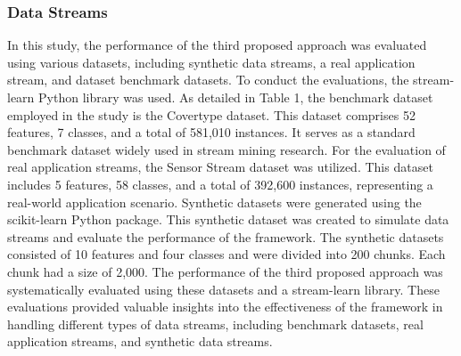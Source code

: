 \subsubsection{Data Streams}
In this study, the performance of the third proposed approach was evaluated using various datasets, including synthetic data streams, a real application stream, and dataset benchmark datasets. To conduct the evaluations, the stream-learn Python library \cite{ksieniewicz2022stream,madkour2023historical} was used. As detailed in Table 1, the benchmark dataset employed in the study is the Covertype dataset. This dataset comprises 52 features, 7 classes, and a total of 581,010 instances. It serves as a standard benchmark dataset widely used in stream mining research. For the evaluation of real application streams, the Sensor Stream dataset was utilized. This dataset includes 5 features, 58 classes, and a total of 392,600 instances, representing a real-world application scenario. Synthetic datasets were generated using the scikit-learn Python package. This synthetic dataset was created to simulate data streams and evaluate the performance of the framework. The synthetic datasets consisted of 10 features and four classes and were divided into 200 chunks. Each chunk had a size of 2,000. The performance of the third proposed approach was systematically evaluated using these datasets and a stream-learn library. These evaluations provided valuable insights into the effectiveness of the framework in handling different types of data streams, including benchmark datasets, real application streams, and synthetic data streams.

\begin{table}[H]
  \centering
  \caption{Summary of Dataset Characteristics Utilized in the HTL.}
  \label{table:6_table1}
  \end{table}

